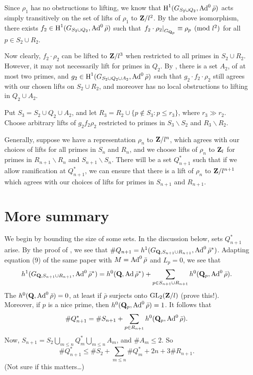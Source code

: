 Since $\rho_1$ has no obstructions to lifting, we know that 
$\operatorname{H}^1(G_{S_2\cup Q_2},\operatorname{Ad}^0\bar\rho)$ acts simply transitively on the set of 
lifts of $\rho_1$ to $\mathbf{Z}/l^2$. By the above isomorphism, there exists 
$f_2\in \operatorname{H}^1(G_{S_2\cup Q_2},\operatorname{Ad}^0\bar\rho)$ such that 
$\left.f_2\cdot \rho_2\right|_{G_{\mathbf{Q}_p}} \equiv \rho_p\pmod{l^2}$ for all 
$p\in S_2\cup R_2$. 

Now clearly, $f_2\cdot \rho_2$ can be lifted to $\mathbf{Z}/l^3$ when restricted to 
all primes in $S_2\cup R_2$. However, it may not necessarily lift for primes in 
$Q_2$. By \cite[Lem.~3.10]{pande-2011}, there is a set $A_2$, of at most 
two primes, and $g_2\in \operatorname{H}^1(G_{S_2\cup Q_2\cup A_2},\operatorname{Ad}^0\bar\rho)$ such that 
$g_2\cdot f_2\cdot \rho_2$ still agrees with our chosen lifts on 
$S_2\cup R_2$, and moreover has no local obstructions to lifting in 
$Q_2\cup A_2$. 

Put $S_3 = S_2\cup Q_2\cup A_2$, and let 
$R_3 = R_2\cup \{p\notin S_3 : p\leqslant r_3\}$, where $r_3\gg r_2$. Choose 
arbitrary lifts of $g_2 f_2 \rho_2$ restricted to primes in 
$S_3\smallsetminus S_2$ and $R_3\smallsetminus R_2$. 

Generally, suppose we have a representation $\rho_n$ to $\mathbf{Z}/l^n$, which 
agrees with our choices of lifts for all primes in $S_n$ and $R_n$, and 
we choose lifts of $\rho_n$ to $\mathbf{Z}_l$ for primes in 
$R_{n+1}\smallsetminus R_n$ and $S_{n+1}\smallsetminus S_n$. There will be a 
set $Q_{n+1}^\ast$ such that if we allow ramification at $Q_{n+1}^\ast$, we can 
ensure that there is a lift of $\rho_n$ to $\mathbf{Z}/l^{n+1}$ which agrees with 
our choices of lifts for primes in $S_{n+1}$ and $R_{n+1}$. 





\section{More summary}

We begin by bounding the size of some sets. In the discussion below, sets 
$Q_{n+1}^\ast$ arise. By the proof of 
\cite[Lem.~8]{khare-larsen-ramakrishna-2005}, we see that 
$\# Q_{n+1} = h^1(G_{\mathbf{Q},S_{n+1}\cup R_{n+1}},\operatorname{Ad}^0\bar\rho^\ast)$. Adapting 
equation (9) of the same paper with $M=\operatorname{Ad}^0\bar\rho$ and 
$L_p = 0$, we see that 
\[
	h^1(G_{\mathbf{Q},S_{n+1}\cup R_{n+1}},\operatorname{Ad}^0\bar\rho^\ast) = h^0(\mathbf{Q},\operatorname{Ad}\bar\rho^\ast) + \sum_{p\in S_{n+1}\cup R_{n+1}} h^0(\mathbf{Q}_p,\operatorname{Ad}^0\bar\rho) .
\]
The $h^0(\mathbf{Q},\operatorname{Ad}^0\bar\rho) = 0$, at least if $\bar\rho$ surjects onto 
$\operatorname{GL}_2(\mathbf{Z}/l)$ (prove this!). Moreover, if $p$ is a nice prime, then 
$h^0(\mathbf{Q}_p,\operatorname{Ad}^0\bar\rho) = 1$. It follows that 
\[
	\# Q_{n+1}^\ast = \# S_{n+1} + \sum_{p\in R_{n+1}} h^0(\mathbf{Q}_p,\operatorname{Ad}^0\bar\rho) .
\]
Now, $S_{n+1} = S_2\bigcup_{m\leqslant n} Q_m^\ast \bigcup_{m\leqslant n} A_m$, 
and $\# A_m \leqslant 2$. So 
\[
	\# Q_{n+1}^\ast \leqslant \# S_2 + \sum_{m\leqslant n} \# Q_m^\ast + 2 n + 3\# R_{n+1} .
\]
(Not sure if this matters\ldots)

